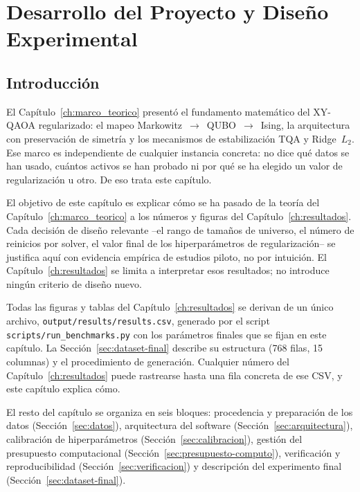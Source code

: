 \chapter{Desarrollo del Proyecto y Diseño Experimental}
\label{ch:desarrollo}

\section{Introducción}

El Capítulo~\ref{ch:marco_teorico} presentó el fundamento matemático del XY-QAOA regularizado: el mapeo Markowitz~$\rightarrow$~QUBO~$\rightarrow$~Ising, la arquitectura con preservación de simetría y los mecanismos de estabilización TQA y Ridge~$L_2$. Ese marco es independiente de cualquier instancia concreta: no dice qué datos se han usado, cuántos activos se han probado ni por qué se ha elegido un valor de regularización u otro. De eso trata este capítulo.

El objetivo de este capítulo es explicar cómo se ha pasado de la teoría del Capítulo~\ref{ch:marco_teorico} a los números y figuras del Capítulo~\ref{ch:resultados}. Cada decisión de diseño relevante --el rango de tamaños de universo, el número de reinicios por solver, el valor final de los hiperparámetros de regularización-- se justifica aquí con evidencia empírica de estudios piloto, no por intuición. El Capítulo~\ref{ch:resultados} se limita a interpretar esos resultados; no introduce ningún criterio de diseño nuevo.

Todas las figuras y tablas del Capítulo~\ref{ch:resultados} se derivan de un único archivo, \texttt{output/results/results.csv}, generado por el script \texttt{scripts/run\_benchmarks.py} con los parámetros finales que se fijan en este capítulo. La Sección~\ref{sec:dataset-final} describe su estructura (768 filas, 15 columnas) y el procedimiento de generación. Cualquier número del Capítulo~\ref{ch:resultados} puede rastrearse hasta una fila concreta de ese CSV, y este capítulo explica cómo.

El resto del capítulo se organiza en seis bloques: procedencia y preparación de los datos (Sección~\ref{sec:datos}), arquitectura del software (Sección~\ref{sec:arquitectura}), calibración de hiperparámetros (Sección~\ref{sec:calibracion}), gestión del presupuesto computacional (Sección~\ref{sec:presupuesto-computo}), verificación y reproducibilidad (Sección~\ref{sec:verificacion}) y descripción del experimento final (Sección~\ref{sec:dataset-final}).

